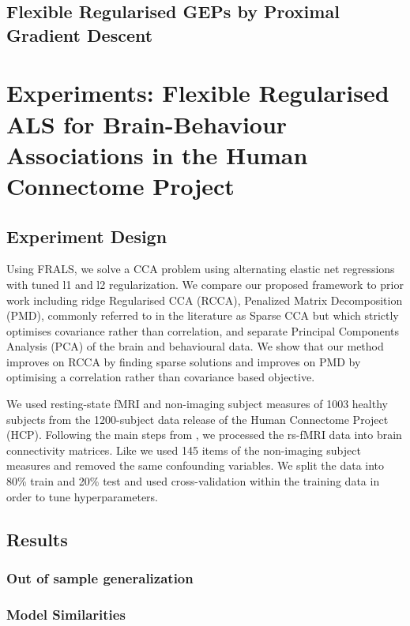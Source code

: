 \subsection{Flexible Regularised GEPs by Proximal Gradient Descent}

\section{Experiments: Flexible Regularised ALS for Brain-Behaviour Associations in the Human Connectome Project}

\subsection{Experiment Design}

Using FRALS, we solve a CCA problem using alternating elastic net regressions with tuned l1 and l2 regularization. We compare our proposed framework to prior work including ridge Regularised CCA (RCCA), Penalized Matrix Decomposition (PMD), commonly referred to in the literature as Sparse CCA but which strictly optimises covariance rather than correlation, and separate Principal Components Analysis (PCA) of the brain and behavioural data. We show that our method improves on RCCA by finding sparse solutions and improves on PMD by optimising a correlation rather than covariance based objective.

We used resting-state fMRI and non-imaging subject measures of 1003 healthy subjects from the 1200-subject data release of the Human Connectome Project (HCP). Following the main steps from \cite{smith2015positive}, we processed the rs-fMRI data into brain connectivity matrices. Like \cite{smith2015positive} we used 145 items of the non-imaging subject measures and removed the same confounding variables. We split the data into 80\% train and 20\% test and used cross-validation within the training data in order to tune hyperparameters.

\subsection{Results}

\subsubsection{Out of sample generalization}

\subsubsection{Model Similarities}

